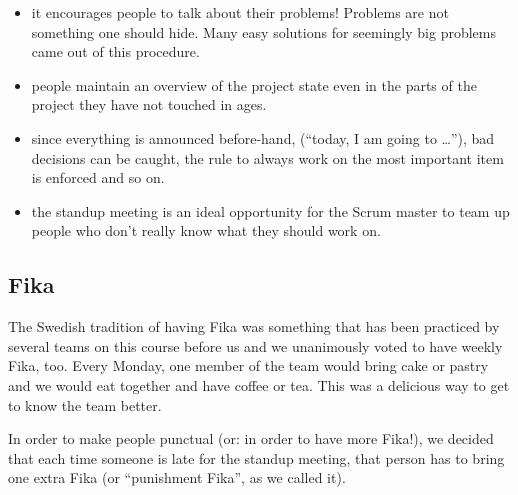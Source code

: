 \documentclass[11pt,a4paper]{report}
\begin{document}
\begin{itemize}
\item it encourages people to talk about their problems!
  Problems are not something one should hide. Many easy solutions for seemingly
  big problems came out of this procedure.
\item people maintain an overview of the project state even in the parts of the
  project they have not touched in ages.
\item since everything is announced before-hand,
  (``today, I am going to \ldots''), bad decisions can be caught, the rule to
  always work on the most important item is enforced and so on.
\item the standup meeting is an ideal opportunity for the Scrum master to team
  up people who don't really know what they should work on.
\end{itemize}
\subsection{Fika}
The Swedish tradition of having Fika was something that has been practiced by
several teams on this course before us and we unanimously voted to have weekly
Fika, too. Every Monday, one member of the team would bring cake or pastry and
we would eat together and have coffee or tea. This was a delicious way to get to
know the team better.

In order to make people punctual (or: in order to have more Fika!), we decided
that each time someone is late for the standup meeting, that person has to
bring one extra Fika (or ``punishment Fika'', as we called it).
\end{document}
